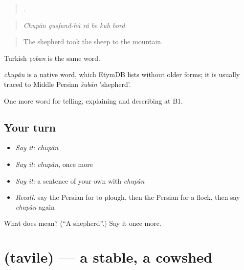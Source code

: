 \begin{quote}
     .
\end{quote}

\begin{quote}
\emph{Chupân gusfand-hâ râ be kuh bord.}
\end{quote}

\begin{quote}
The shepherd took the sheep to the mountain.
\end{quote}

Turkish \emph{çoban} is the same word.

\begin{cousinweb}
\emph{chupân} is a native word, which EtymDB lists without older forms; it is usually traced to Middle Persian \emph{šubān} 'shepherd'.
\end{cousinweb}

\begin{grammarlens}[title={What you've built}]
One more word for telling, explaining and describing at B1.
\end{grammarlens}

\subsection*{Your turn}
\begin{itemize}
\raggedright
  \item \emph{Say it:} \emph{chupân}
  \item \emph{Say it:} \emph{chupân}, once more
  \item \emph{Say it:} a sentence of your own with \emph{chupân}
  \item \emph{Recall:} say the Persian for to plough, then the Persian for a flock, then say \emph{chupân} again
\end{itemize}

\begin{tcolorbox}[breakable,colback=teal!4,colframe=teal!35!black,title={Before you move on}]
What does  mean? (\textquotedblleft{}A shepherd\textquotedblright{}.) Say it once more.
\end{tcolorbox}
\section[\texorpdfstring{\fa{طویله} (tavile)}{طویله (tavile)}]{ (tavile) — a stable, a cowshed}

\label{lesson:FA-C466-tavile}



